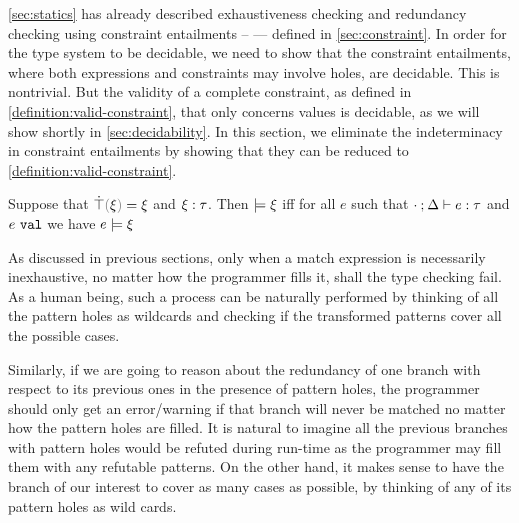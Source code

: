 \autoref{sec:statics} has already described exhaustiveness checking and redundancy checking using constraint entailments --  --- defined in \autoref{sec:constraint}. In order for the type system to be decidable, we need to show that the constraint entailments, where both expressions and constraints may involve holes, are decidable. This is nontrivial. But the validity of a complete constraint, as defined in \autoref{definition:valid-constraint}, that only concerns values is decidable, as we will show shortly in \autoref{sec:decidability}.
%
In this section, we eliminate the indeterminacy in constraint entailments by showing that they can be reduced to \autoref{definition:valid-constraint}. 

\begin{definition}
  \label{definition:valid-constraint}
  Suppose that $\ctruify{\xi}=\xi$ and $\xi : \tau$.
  Then $\models \xi$ iff for all $e$ such that $\cdot \mathbin{;} \Delta \vdash e : \tau$ and $e ~\mathtt{val}$ we have $e \models \xi$
\end{definition}


As discussed in previous sections, only when a match expression is necessarily inexhaustive, no matter how the programmer fills it, shall the type checking fail. As a human being, such a process can be naturally performed by thinking of all the pattern holes as wildcards and checking if the transformed patterns cover all the possible cases. 

Similarly, if we are going to reason about the redundancy of one branch with respect to its previous ones in the presence of pattern holes, the programmer should only get an error/warning if that branch will never be matched no matter how the pattern holes are filled. It is natural to imagine all the previous branches with pattern holes would be refuted during run-time as the programmer may fill them with any refutable patterns. On the other hand, it makes sense to have the branch of our interest to cover as many cases as possible, by thinking of any of its pattern holes as wild cards.%


